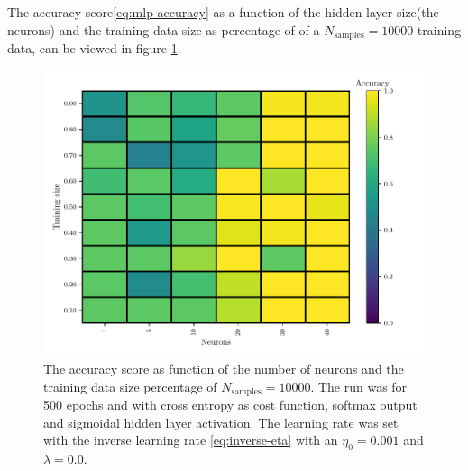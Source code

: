 The accuracy score\eqref{eq:mlp-accuracy} as a function of the hidden layer size(the neurons) and the training data size as percentage of of a $N_\mathrm{samples}=10000$ training data, can be viewed in figure \ref{fig:mlp-neurons-ts}.
\begin{figure}[H]
    \centering
    \includegraphics[scale=1.0]{../fig/mlp_neurons_training_size.pdf}
    \caption{The accuracy score as function of the number of neurons and the training data size percentage of $N_\mathrm{samples}=10000$. The run was for 500 epochs and with cross entropy as cost function, softmax output and sigmoidal hidden layer activation. The learning rate was set with the inverse learning rate \eqref{eq:inverse-eta} with an $\eta_0=0.001$ and $\lambda=0.0$. }
    \label{fig:mlp-neurons-ts}
\end{figure}

